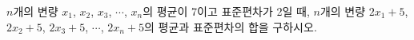 $n$개의 변량 $x_1$, $x_2$, $x_3$, $\cdots$, $x_n$의 평균이 7이고 표준편차가 2일 때, $n$개의 변량 $2x_1+5$, $2x_2+5$, $2x_3+5$, $\cdots$, $2x_n+5$의 평균과 표준편차의 합을 구하시오.

